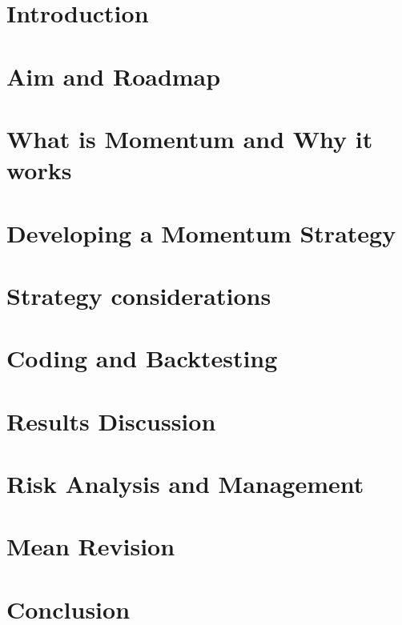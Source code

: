 \documentclass[a4paper]{article}
\begin{document}
\tableofcontents

\newpage

\setcounter{page}{1}

\section{Introduction}

\newpage

\section{Aim and Roadmap}

\newpage

\section{What is Momentum and Why it works}

\newpage

\section{Developing a Momentum Strategy}

\newpage

\section{Strategy considerations}

\newpage

\section{Coding and Backtesting}

\newpage

\section{Results Discussion}

\newpage

\section{Risk Analysis and Management}

\newpage

\section{Mean Revision}

\newpage

\section{Conclusion}

\newpage
\end{document}
